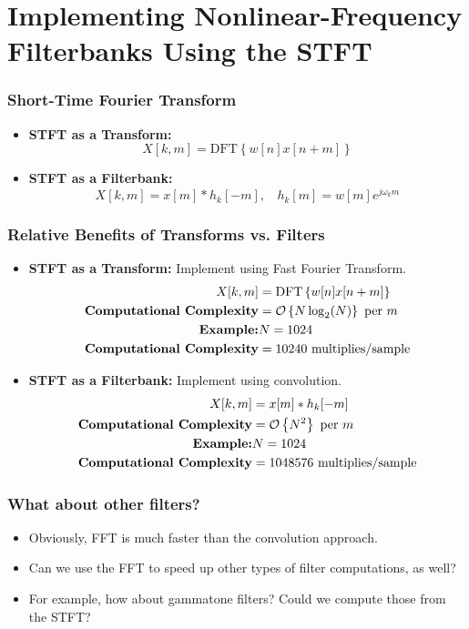 \documentclass{beamer}
\begin{document}
\section[Nonlinear Frequency]{Implementing Nonlinear-Frequency Filterbanks Using the STFT}
\setcounter{subsection}{1}

\begin{frame}
  \frametitle{Short-Time Fourier Transform}
  \begin{itemize}
  \item {\bf STFT as a Transform:}
    \[
    X[k,m] = \mbox{DFT}\left\{w[n]x[n+m]\right\}
    \]
  \item {\bf STFT as a Filterbank:}
    \[
    X[k,m] = x[m] \ast h_k[-m],~~~~h_k[m] = w[m]e^{j\omega_k m}
    \]
  \end{itemize}
\end{frame}

\begin{frame}
  \frametitle{Relative Benefits of Transforms vs. Filters}
  \begin{itemize}
  \item {\bf STFT as a Transform:} Implement using Fast Fourier Transform.
    \begin{align*}
      X[k,m]&= \mbox{DFT}\left\{w[n]x[n+m]\right\}\\
      \mbox{\bf Computational Complexity} &= {\mathcal O}\left\{N\log_2(N)\right\}~\mbox{per}~m\\
      \mbox{\bf Example:} & N=1024\\
      \mbox{\bf Computational Complexity} &= 10240~\mbox{multiplies/sample}
    \end{align*}
  \item {\bf STFT as a Filterbank:} Implement using convolution.
    \begin{align*}
      X[k,m]&= x[m]\ast h_k[-m]\\
      \mbox{\bf Computational Complexity} &= {\mathcal O}\left\{N^2\right\}~\mbox{per}~m\\
      \mbox{\bf Example:} & N=1024\\
      \mbox{\bf Computational Complexity} &= 1048576~\mbox{multiplies/sample}
    \end{align*}
  \end{itemize}
\end{frame}

\begin{frame}
  \frametitle{What about other filters?}

  \begin{itemize}
  \item Obviously, FFT is much faster than the convolution approach.
  \item Can we use the FFT to speed up other types of filter computations, as well?
  \item For example, how about gammatone filters?  Could we compute those
    from the STFT?
  \end{itemize}
\end{frame}
\end{document}
